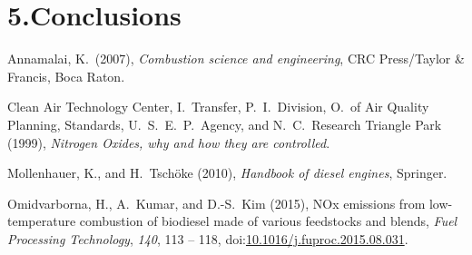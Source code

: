 \documentclass[9pt]{report}
\begin{document}
\section{5.\hspace*{0.5em}Conclusions}\label{sec-conclusions}%

{\mdsupressbiblabel{}\begin{thebibliography}{4}%
\label{sec-bibliography}%

\mdbibitemlabel{}Annamalai, K.~(2007), \emph{Combustion science and engineering}, CRC Press/Taylor \& Francis, Boca Raton.\label{annamalai2007combustion}%

\mdbibitemlabel{}Clean Air Technology Center, I.~Transfer, P.~I.~Division, O.~of Air Quality Planning, Standards, U.~S.~E.~P.~Agency, and N.~C.~Research Triangle Park (1999), \emph{Nitrogen Oxides, why and how they are controlled}.\label{epabulletin}%

\mdbibitemlabel{}Mollenhauer, K., and H.~Tschöke (2010), \emph{Handbook of diesel engines}, Springer.\label{mollenhauer2010handbook}%

\mdbibitemlabel{}Omidvarborna, H., A.~Kumar, and D.-S.~Kim (2015), NOx emissions from low-temperature combustion of biodiesel made of various feedstocks and blends, \emph{Fuel Processing Technology}, \emph{140}, 113 – 118, doi:\href{https://dx.doi.org/10.1016/j.fuproc.2015.08.031}{10.1016/j.fuproc.2015.08.031}.\label{omidvarborna2015113}%
\par%
\end{thebibliography}}%
\end{document}
